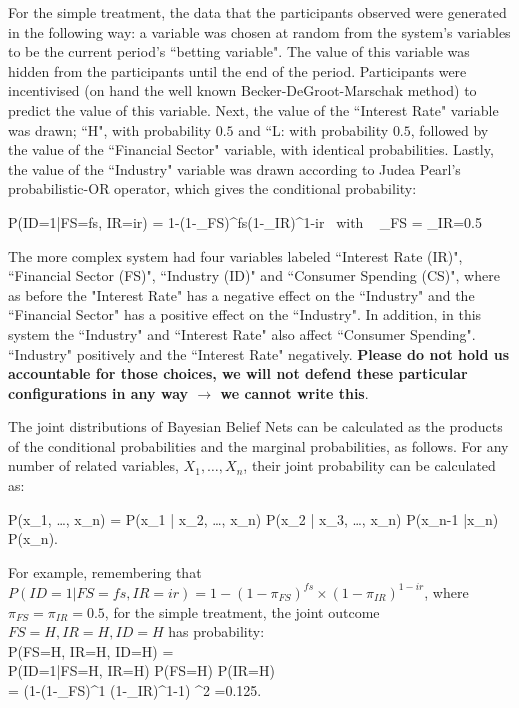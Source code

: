 For the simple treatment, the data that the participants observed were generated in the following way: a variable was chosen at 
random from the system's variables to be the current period's ``betting variable". The value of this variable was hidden from the 
participants until the end of the period. Participants were incentivised (on hand the well known Becker-DeGroot-Marschak 
method) to predict the value of this variable. Next, the value of the ``Interest Rate" variable was drawn; ``H", with probability $0.5$ 
and ``L: with probability $0.5$, followed by the value of the ``Financial Sector" variable, with identical probabilities. Lastly, the value of 
the ``Industry" variable was drawn according to Judea Pearl's \citep{Pearl88} probabilistic-OR operator, which gives the conditional 
probability:  

\be
P(ID=1|FS=fs, IR=ir) = 1-(1-\pi_{FS})^{fs}(1-\pi_{IR})^{1-ir} ~with ~ \pi_{FS} = \pi_{IR}=0.5
\ee

The more complex system had four variables labeled ``Interest Rate (IR)", ``Financial Sector (FS)", ``Industry (ID)" and ``Consumer 
Spending (CS)", where as before the "Interest Rate" has a negative effect on the ``Industry" and the ``Financial Sector" has a positive 
effect on the ``Industry". In addition, in this system the ``Industry" and ``Interest Rate" also affect ``Consumer Spending". ``Industry" 
positively and the ``Interest Rate" negatively.  {\bf Please do not hold us accountable for those choices, we will not defend these 
particular configurations in any way $\rightarrow$  we cannot write this}.

The joint distributions of Bayesian Belief Nets can be calculated as the products of the conditional probabilities and the marginal 
probabilities, as follows. For any number of related variables, $X_1, \ldots, X_n$, their joint probability can be calculated as:

\be
P(x_1, \ldots, x_n) = P(x_1 | x_2, \ldots, x_n) \times P(x_2 | x_3, \ldots, x_n) \times \cdots \times P(x_{n-1} |x_n) \times P(x_n).
\ee

For example, remembering that $P(ID=1|FS=fs, IR=ir) = 1-(1-\pi_{FS})^{fs} \times (1-\pi_{IR})^{1-ir}$, where $\pi_{FS}=\pi_{IR}=0.5$, for 
the simple treatment, the joint outcome $FS=H, IR=H, ID=H$ has probability:\\

\ba
P(FS=H, IR=H, ID=H) =\\ 
P(ID=1|FS=H, IR=H) \times P(FS=H) \times P(IR=H) \\
=  \left(1-(1-\pi_{FS})^{1} \times (1-\pi_{IR})^{1-1}\right) ^2 =0.125.  
\ea

